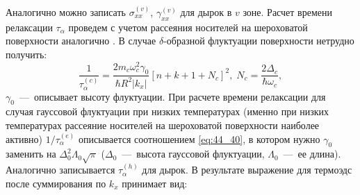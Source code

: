 Аналогично можно записать $\sigma _{xx}^{(v)} $, $\gamma _{xx}^{(v)} $ для дырок в $v$ зоне. Расчет времени релаксации $\tau _{\alpha } $ проведем с учетом рассеяния носителей на шероховатой поверхности аналогично \cite{Karapetyan2011}. В случае $\delta $-образной флуктуации поверхности нетрудно получить:
\begin{equation} \label{eq:44_40}
\frac{1}{\tau_{\alpha }^{(c)} } =\frac{2m_c \omega_c^2 \gamma_0 }{\hbar R^2 \left| k_x \right|} \left[n+k+1+N_c \right]^2, \; N_c =\frac{2 \Delta_c }{\hbar \omega_c} ,
\end{equation} 
$\gamma_0 $~---~описывает высоту флуктуации. При расчете времени релаксации для случая гауссовой флуктуации \cite{Vurgaftman1999} при низких температурах (именно при низких температурах рассеяние носителей на шероховатой поверхности наиболее активно) $1 / \tau_{\alpha }^{(e)} $ описывается соотношением \eqref{eq:44_40}, в котором нужно $\gamma_0 $ заменить на $\Delta_0^2 \Lambda_0 \sqrt{\pi}$ ($\Delta_0 $~---~высота гауссовой флуктуации, $\Lambda_0 $~---~ее длина). Аналогично записывается $\tau_{\alpha }^{(h)} $ для дырок. В результате выражение для термоэдс после суммирования по $k_x $ принимает вид:
 
